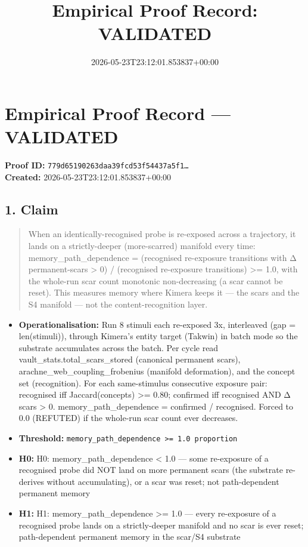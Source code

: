 \documentclass{article}
\title{Empirical Proof Record: VALIDATED}
\date{2026-05-23T23:12:01.853837+00:00}
\begin{document}
\maketitle
\section*{Empirical Proof Record --- \textcolor{validated}{\textbf{VALIDATED}}}
\textbf{Proof ID:} \texttt{779d65190263daa39fcd53f54437a5f1\dots}\\
\textbf{Created:} 2026-05-23T23:12:01.853837+00:00
\subsection*{1. Claim}
\begin{quote}When an identically-recognised probe is re-exposed across a trajectory, it lands on a strictly-deeper (more-scarred) manifold every time: memory\_path\_dependence = (recognised re-exposure transitions with Δ permanent-scars > 0) / (recognised re-exposure transitions) >= 1.0, with the whole-run scar count monotonic non-decreasing (a scar cannot be reset). This measures memory where Kimera keeps it — the scars and the S4 manifold — not the content-recognition layer.\end{quote}
\begin{itemize}
\item \textbf{Operationalisation:} Run 8 stimuli each re-exposed 3x, interleaved (gap = len(stimuli)), through Kimera's entity target (Takwin) in batch mode so the substrate accumulates across the batch. Per cycle read vault\_stats.total\_scars\_stored (canonical permanent scars), arachne\_web\_coupling\_frobenius (manifold deformation), and the concept set (recognition). For each same-stimulus consecutive exposure pair: recognised iff Jaccard(concepts) >= 0.80; confirmed iff recognised AND Δ scars > 0. memory\_path\_dependence = confirmed / recognised. Forced to 0.0 (REFUTED) if the whole-run scar count ever decreases.
\item \textbf{Threshold:} \texttt{memory\_path\_dependence >= 1.0 proportion}
\item \textbf{H0:} H0: memory\_path\_dependence < 1.0 — some re-exposure of a recognised probe did NOT land on more permanent scars (the substrate re-derives without accumulating), or a scar was reset; not path-dependent permanent memory
\item \textbf{H1:} H1: memory\_path\_dependence >= 1.0 — every re-exposure of a recognised probe lands on a strictly-deeper manifold and no scar is ever reset; path-dependent permanent memory in the scar/S4 substrate
\end{itemize}
\end{document}
